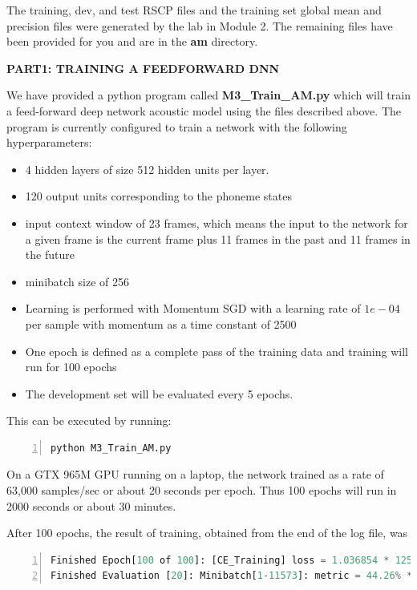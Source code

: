 The training, dev, and test RSCP files and the training set global mean and precision files were generated by the lab in Module 2. The remaining files have been provided for you and are in the {\bf am} directory.

{\bf PART1: TRAINING A FEEDFORWARD DNN}

We have provided a python program called {\bf M3\_Train\_AM.py} which will train a feed-forward deep network acoustic model using the files described above. The program is currently configured to train a network with the following hyperparameters:
\begin{itemize}
  \item 4 hidden layers of size 512 hidden units per layer.
  \item 120 output units corresponding to the phoneme states
  \item input context window of 23 frames, which means the input to the network for a given frame is the current frame plus 11 frames in the past and 11 frames in the future
  \item minibatch size of 256
  \item Learning is performed with Momentum SGD with a learning rate of $1e-04$ per sample with momentum as a time constant of 2500
  \item One epoch is defined as a complete pass of the training data and training will run for 100 epochs
  \item The development set will be evaluated every 5 epochs.
\end{itemize}

This can be executed by running:
\begin{lstlisting}[language = python, numbers=left, 
         numberstyle=\tiny,keywordstyle=\color{blue!70},
         commentstyle=\color{red!50!green!50!blue!50},frame=shadowbox,
         rulesepcolor=\color{red!20!green!20!blue!20},basicstyle=\ttfamily]
python M3_Train_AM.py
\end{lstlisting}

On a GTX 965M GPU running on a laptop, the network trained as a rate of 63,000 samples/sec or about 20 seconds per epoch. Thus 100 epochs will run in 2000 seconds or about 30 minutes.

After 100 epochs, the result of training, obtained from the end of the log file, was
\begin{lstlisting}[language = python, numbers=left, 
         numberstyle=\tiny,keywordstyle=\color{blue!70},
         commentstyle=\color{red!50!green!50!blue!50},frame=shadowbox,
         rulesepcolor=\color{red!20!green!20!blue!20},basicstyle=\ttfamily]
Finished Epoch[100 of 100]: [CE_Training] loss = 1.036854 * 1257104, metric = 32.74% * 1257104 17.146s (73317.6 samples/s);
Finished Evaluation [20]: Minibatch[1-11573]: metric = 44.26% * 370331;
\end{lstlisting}

